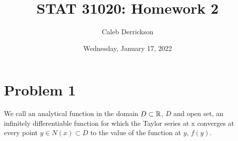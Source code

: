 

\title{STAT 31020: Homework 2}
\author{Caleb Derrickson}
\date{Wednesday, January 17, 2022}


\onehalfspacing
\maketitle
\allowdisplaybreaks


\tableofcontents

\newpage
\section{Problem 1}
We call an analytical function in the domain $D \subset \mathbb{R}$, $D$ and open set, an infinitely differentiable function for which the Taylor series at x converges at every point $y \in N(x) \subset D$ to the value of the function at $y$, $f(y)$.

